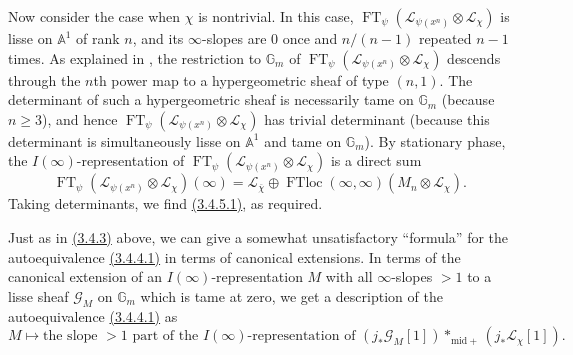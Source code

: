 Now consider the case when \(\chi\) is nontrivial. In this case,
\(\operatorname{FT}_{\psi}(\mathcal{L}_{\psi(x^n)}\otimes\mathcal{L}_{\chi})\)
is lisse on \(\mathbb{A}^1\) of rank \(n\), and its \(\infty\)-slopes are
\(0\) once and \(n/(n-1)\) repeated \(n-1\) times. As explained in
\cite[9.2.2]{Ka-GKM}, the restriction to \(\mathbb{G}_m\) of
\(\operatorname{FT}_{\psi}(\mathcal{L}_{\psi(x^n)}\otimes\mathcal{L}_{\chi})\)
descends through the \(n\)th power map to a hypergeometric sheaf of type
\((n,1)\). The determinant of such a hypergeometric sheaf is necessarily tame
on \(\mathbb{G}_m\) (because \(n\geq3\)), and hence
\(\operatorname{FT}_{\psi}(\mathcal{L}_{\psi(x^n)}\otimes\mathcal{L}_{\chi})\)
has trivial determinant (because this determinant is simultaneously lisse on
\(\mathbb{A}^1\) and tame on \(\mathbb{G}_m\)). By stationary phase, the
\(I(\infty)\)-representation of
\(\operatorname{FT}_{\psi}(\mathcal{L}_{\psi(x^n)}\otimes\mathcal{L}_{\chi})\)
is a direct sum
\[
  \operatorname{FT}_{\psi}(\mathcal{L}_{\psi(x^n)}\otimes\mathcal{L}_{\chi})(\infty)
  =
  \mathcal{L}_{\overline{\chi}}
  \oplus
  \operatorname{FTloc}(\infty,\infty)(M_n\otimes\mathcal{L}_{\chi}).
\]
Taking determinants, we find \hyperref[par:3.4.5.1]{(3.4.5.1)}, as required.

Just as in \hyperref[par:3.4.3]{(3.4.3)} above, we can give a somewhat
unsatisfactory ``formula'' for the autoequivalence
\hyperref[par:3.4.4.1]{(3.4.4.1)} in terms of canonical extensions. In terms
of the canonical extension of an \(I(\infty)\)-representation \(M\) with all
\(\infty\)-slopes \(>1\) to a lisse sheaf \(\mathcal{G}_M\) on
\(\mathbb{G}_m\) which is tame at zero, we get a description of the
autoequivalence \hyperref[par:3.4.4.1]{(3.4.4.1)} as
\[
  M\longmapsto
  \text{the slope }>1\text{ part of the }I(\infty)\text{-representation of }
  (j_*\mathcal{G}_M[1])*_{\mathrm{mid}+}(j_*\mathcal{L}_{\chi}[1]).
\]
